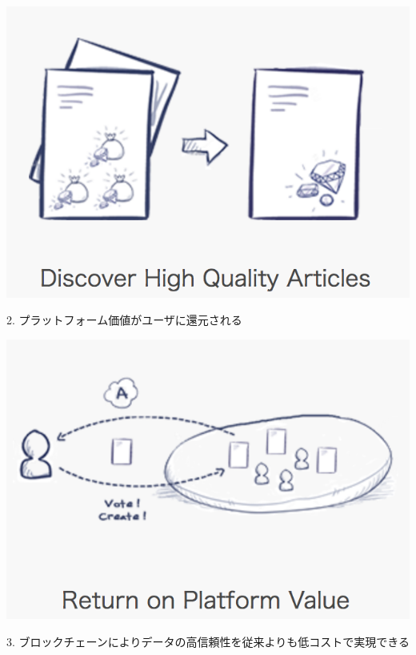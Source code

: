 \documentclass{jsarticle}
\begin{document}
\begin{center}
	\includegraphics[scale=0.4]{img/discoverarticle.png}
\end{center}

2. プラットフォーム価値がユーザに還元される

\begin{center}
	\includegraphics[scale=0.4]{img/returnvalue.png}
\end{center}

3. ブロックチェーンによりデータの高信頼性を従来よりも低コストで実現できる
\end{document}
